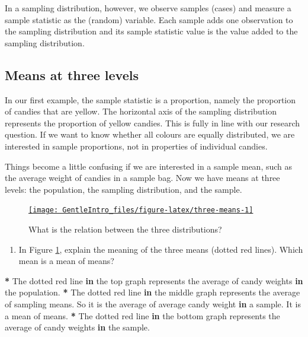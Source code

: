 \documentclass[a4paper]{book}
\newenvironment{Shaded}{\begin{snugshade}}{\end{snugshade}}
\newcommand{\StringTok}[1]{\textcolor[rgb]{0.00,0.00,0.00}{#1}}
\newcommand{\ControlFlowTok}[1]{\textcolor[rgb]{0.00,0.00,0.00}{\textbf{#1}}}
\newcommand{\OperatorTok}[1]{\textcolor[rgb]{0.00,0.00,0.00}{\textbf{#1}}}
\newcommand{\NormalTok}[1]{#1}
\providecommand{\tightlist}{%
  \setlength{\itemsep}{0pt}\setlength{\parskip}{0pt}}
\theoremstyle{definition}
\theoremstyle{definition}
\theoremstyle{definition}
\theoremstyle{remark}
\begin{document}
In a sampling distribution, however, we observe samples (cases) and
measure a sample statistic as the (random) variable. Each sample adds
one observation to the sampling distribution and its sample statistic
value is the value added to the sampling distribution.

\subsection{Means at three levels}\label{means-at-three-levels}

In our first example, the sample statistic is a proportion, namely the
proportion of candies that are yellow. The horizontal axis of the
sampling distribution represents the proportion of yellow candies. This
is fully in line with our research question. If we want to know whether
all colours are equally distributed, we are interested in sample
proportions, not in properties of individual candies.

Things become a little confusing if we are interested in a sample mean,
such as the average weight of candies in a sample bag. Now we have means
at three levels: the population, the sampling distribution, and the
sample.

\begin{figure}[H]
\href{http://82.196.4.233:3838/apps/three-means/}{\texttt{[image: GentleIntro\_files/figure-latex/three-means-1]} }\caption{What is the relation between the three distributions?}\label{fig:three-means}
\end{figure}

\begin{enumerate}
\def\labelenumi{\arabic{enumi}.}
\tightlist
\item
  In Figure \ref{fig:three-means}, explain the meaning of the three
  means (dotted red lines). Which mean is a mean of means?
\end{enumerate}

\begin{Shaded}
\begin{Highlighting}[]
\OperatorTok{*}\StringTok{ }\NormalTok{The dotted red line }\ControlFlowTok{in}\NormalTok{ the top graph represents the average of candy weights}
\ControlFlowTok{in}\NormalTok{ the population.}
\OperatorTok{*}\StringTok{ }\NormalTok{The dotted red line }\ControlFlowTok{in}\NormalTok{ the middle graph represents the average of sampling}
\NormalTok{means. So it is the average of average candy weight }\ControlFlowTok{in}\NormalTok{ a sample. It is a mean}
\NormalTok{of means.}
\OperatorTok{*}\StringTok{ }\NormalTok{The dotted red line }\ControlFlowTok{in}\NormalTok{ the bottom graph represents the average of candy}
\NormalTok{weights }\ControlFlowTok{in}\NormalTok{ the sample.}
\end{Highlighting}
\end{Shaded}
\end{document}
